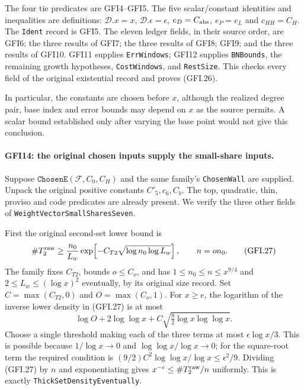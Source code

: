 The four tie predicates are GFI4--GFI5.  The five scalar/constant
identities and inequalities are definitions: $\mathscr D.x=x$,
$\mathscr D.\epsilon=\epsilon$, $e_D=C_{\rm abs}$,
$e_P=e_L$ and $c_{HH}=C_H$.  The \texttt{Ident} record is GFI5.
The eleven ledger fields, in their source order, are GFI6;
the three results of GFI7; the three results of GFI8; GFI9;
and the three results of GFI10.  GFI11 supplies
\texttt{ErrWindows}; GFI12 supplies \texttt{BNBounds}, the
remaining growth hypotheses, \texttt{CostWindows}, and
\texttt{RestSize}.  This checks every field of the original
existential record and proves (GFI.26).

In particular, the constants are chosen before $x$, although the
realized degree pair, base index and error bounds may depend on $x$
as the source permits.  A scalar bound established only after
varying the base point would not give this conclusion.

\paragraph{GFI14: the original chosen inputs supply the small-share inputs.}
\label{claim:GFI14}
Suppose $\texttt{ChosenE}(\mathcal F,C_0,C_H)$ and the same
family's \texttt{ChosenWall} are supplied.  Unpack the original
positive constants $C'_5,c_6,C_b$.  The top, quadratic, thin,
proviso and code predicates are already present.  We verify the
three other fields of \texttt{WeightVectorSmallSharesSeven}.

First the original second-set lower bound is
\[
 \#T_2^{\rm raw}\ge
 \frac{n_0}{L_w}
 \exp\!\left[-C_{T2}\sqrt{\log n_0\log L_w}\right],
 \qquad n=o n_0.                                      \tag{GFI.27}
\]
The family fixes $C_{T2}$, bounds $o\le C_o$, and has
$1\le n_0\le n\le x^{9/4}$ and $2\le L_w\le(\log x)^2$
eventually, by its original size record.  Set
$C=\max(C_{T2},0)$ and $O=\max(C_o,1)$.  For $x\ge e$,
the logarithm of the inverse lower density in (GFI.27) is at most
\[
 \log O+2\log\log x+
       C\sqrt{\tfrac92\log x\log\log x}.              \tag{GFI.28}
\]
Choose a single threshold making each of the three terms at most
$\epsilon\log x/3$.  This is possible because
$1/\log x\to0$ and $\log\log x/\log x\to0$; for the square-root
term the required condition is
$(9/2)C^2\log\log x/\log x\le\epsilon^2/9$.
Dividing (GFI.27) by $n$ and exponentiating gives
$x^{-\epsilon}\le\#T_2^{\rm raw}/n$ uniformly.  This is exactly
\texttt{ThickSetDensityEventually}.

